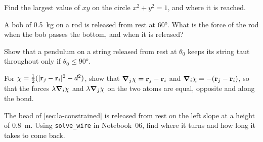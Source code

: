 \begin{exercise}
\label{ex:la-unit}
Find the largest value of $xy$ on the circle $x^2 + y^2 = 1$, and where
it is reached.
\end{exercise}

\begin{exercise}
\label{ex:la-swing}
A bob of \SI{0.5}{\kilogram} on a rod is released from rest at \ang{60}.
What is the force of the rod when the bob passes the bottom, and when it
is released?
\end{exercise}

\begin{exercise}
\label{ex:la-slack}
Show that a pendulum on a string released from rest at $\theta_0$ keeps
its string taut throughout only if $\theta_0 \le \ang{90}$.
\end{exercise}

\begin{exercise}
\label{ex:la-bond}
For $\chi = \frac12(\lvert\bm{\mathrm{r}}_j - \bm{\mathrm{r}}_i\rvert^2 - d^2)$, show that
$\bm{\nabla}_j\chi = \bm{\mathrm{r}}_j - \bm{\mathrm{r}}_i$ and $\bm{\nabla}_i\chi = -(\bm{\mathrm{r}}_j -
\bm{\mathrm{r}}_i)$, so that the forces $\lambda\bm{\nabla}_i\chi$ and $\lambda\bm{\nabla}_j
\chi$ on the two atoms are equal, opposite and along the bond.
\end{exercise}

\begin{exercise}
\label{ex:la-small-swing}
The bead of \cref{sec:la-constrained} is released from rest on the left
slope at a height of \SI{0.8}{\metre}. Using \texttt{solve\_wire} in
Notebook~06, find where it turns and how long it takes to come back.
\end{exercise}
